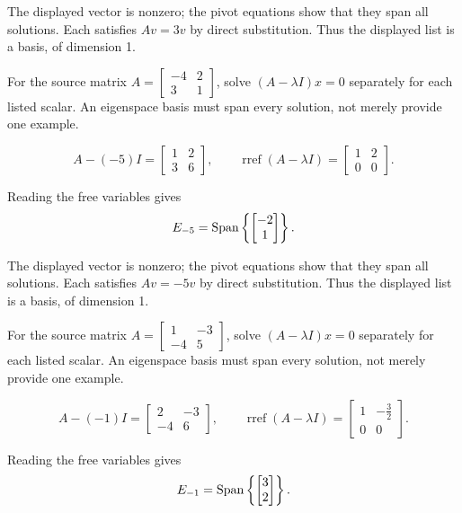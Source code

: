 The displayed vector is nonzero; the pivot equations show that they span all solutions. Each satisfies $Av=3v$ by direct substitution. Thus the displayed list is a basis, of dimension 1.

For the source matrix $A=\begin{bmatrix}-4 & 2\\3 & 1\end{bmatrix}$, solve $(A-\lambda I)x=0$ separately for each listed scalar. An eigenspace basis must span every solution, not merely provide one example.

\[ A-(-5)I=\begin{bmatrix}1 & 2\\3 & 6\end{bmatrix},\qquad\operatorname{rref}(A-\lambda I)=\begin{bmatrix}1 & 2\\0 & 0\end{bmatrix}.\]

Reading the free variables gives
\[ E_{-5}=\operatorname{Span}\left\{\begin{bmatrix}-2\\1\end{bmatrix}\right\}.\]

The displayed vector is nonzero; the pivot equations show that they span all solutions. Each satisfies $Av=-5v$ by direct substitution. Thus the displayed list is a basis, of dimension 1.

For the source matrix $A=\begin{bmatrix}1 & -3\\-4 & 5\end{bmatrix}$, solve $(A-\lambda I)x=0$ separately for each listed scalar. An eigenspace basis must span every solution, not merely provide one example.

\[ A-(-1)I=\begin{bmatrix}2 & -3\\-4 & 6\end{bmatrix},\qquad\operatorname{rref}(A-\lambda I)=\begin{bmatrix}1 & - \frac{3}{2}\\0 & 0\end{bmatrix}.\]

Reading the free variables gives
\[ E_{-1}=\operatorname{Span}\left\{\begin{bmatrix}3\\2\end{bmatrix}\right\}.\]


